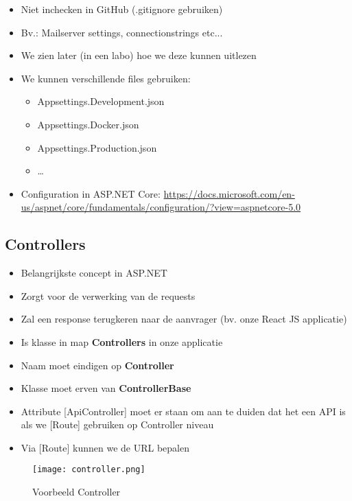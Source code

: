 \documentclass{article}
\begin{document}
\begin{itemize}
    \item Niet inchecken in GitHub (.gitignore gebruiken)
    \item Bv.: Mailserver settings, connectionstrings etc...
    \item We zien later (in een labo) hoe we deze kunnen uitlezen
    \item We kunnen verschillende files gebruiken:
    \begin{itemize}
        \item Appsettings.Development.json
        \item Appsettings.Docker.json
        \item Appsettings.Production.json
        \item \dots
    \end{itemize}
    \item Configuration in ASP.NET Core: \url{https://docs.microsoft.com/en-us/aspnet/core/fundamentals/configuration/?view=aspnetcore-5.0}
\end{itemize}

\subsection{Controllers}

\begin{itemize}
    \item Belangrijkste concept in ASP.NET
    \item Zorgt voor de verwerking van de requests
    \item Zal een response terugkeren naar de aanvrager (bv. onze React JS applicatie)
    \item Is klasse in map \textbf{Controllers} in onze applicatie
    \item Naam moet eindigen op \textbf{Controller}
    \item Klasse moet erven van \textbf{ControllerBase}
    \item Attribute [ApiController] moet er staan om aan te duiden dat het een API is als we [Route] gebruiken op Controller niveau
    \item Via [Route] kunnen we de URL bepalen
\end{itemize}

\begin{figure}[H]
    \centering
    \texttt{[image: controller.png]}
    \caption{Voorbeeld Controller}
\end{figure}
\end{document}
